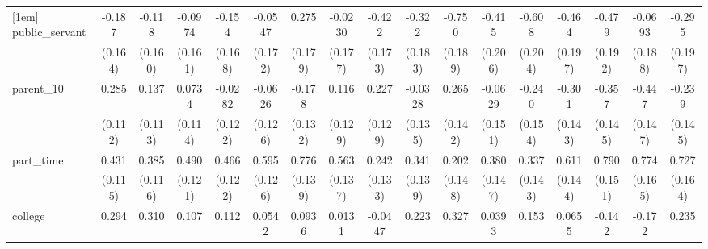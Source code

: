 {\begin{tabular}{l*{16}{c}}
[1em]
public\_servant      &      -0.187         &      -0.118         &     -0.0974         &      -0.154         &     -0.0547         &       0.275         &     -0.0230         &      -0.422\sym{*}  &      -0.322         &      -0.750\sym{***}&      -0.415\sym{*}  &      -0.608\sym{**} &      -0.464\sym{*}  &      -0.479\sym{*}  &     -0.0693         &      -0.295         \\
                    &     (0.164)         &     (0.160)         &     (0.161)         &     (0.168)         &     (0.172)         &     (0.179)         &     (0.177)         &     (0.173)         &     (0.183)         &     (0.189)         &     (0.206)         &     (0.204)         &     (0.197)         &     (0.192)         &     (0.188)         &     (0.197)         \\
[1em]
parent\_10           &       0.285\sym{*}  &       0.137         &      0.0734         &     -0.0282         &     -0.0626         &      -0.178         &       0.116         &       0.227         &     -0.0328         &       0.265         &     -0.0629         &      -0.240         &      -0.301\sym{*}  &      -0.357\sym{*}  &      -0.447\sym{**} &      -0.239         \\
                    &     (0.112)         &     (0.113)         &     (0.114)         &     (0.122)         &     (0.126)         &     (0.132)         &     (0.129)         &     (0.129)         &     (0.135)         &     (0.142)         &     (0.151)         &     (0.154)         &     (0.143)         &     (0.145)         &     (0.147)         &     (0.145)         \\
[1em]
part\_time           &       0.431\sym{***}&       0.385\sym{***}&       0.490\sym{***}&       0.466\sym{***}&       0.595\sym{***}&       0.776\sym{***}&       0.563\sym{***}&       0.242         &       0.341\sym{*}  &       0.202         &       0.380\sym{**} &       0.337\sym{*}  &       0.611\sym{***}&       0.790\sym{***}&       0.774\sym{***}&       0.727\sym{***}\\
                    &     (0.115)         &     (0.116)         &     (0.121)         &     (0.122)         &     (0.126)         &     (0.139)         &     (0.137)         &     (0.133)         &     (0.139)         &     (0.148)         &     (0.147)         &     (0.143)         &     (0.144)         &     (0.151)         &     (0.165)         &     (0.164)         \\
[1em]
college             &       0.294\sym{*}  &       0.310\sym{*}  &       0.107         &       0.112         &      0.0542         &      0.0936         &      0.0131         &     -0.0447         &       0.223         &       0.327\sym{*}  &      0.0393         &       0.153         &      0.0655         &      -0.142         &      -0.172         &       0.235         \\

\end{tabular}}
